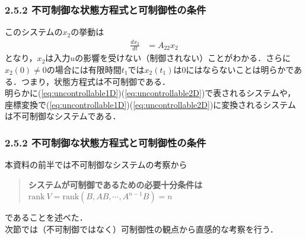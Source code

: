 \begin{frame}[t]
\frametitle{2.5.2 不可制御な状態方程式と可制御性の条件}
このシステムの$x_2$の挙動は
\begin{align}
 \frac{dx_2}{dt} &= A_{22} x_2
\end{align}
となり，$x_2$は入力$u$の影響を受けない（制御されない）ことがわかる．さらに$x_2(0) \neq 0$の場合には有限時間$t_1$では$x_2(t_1)$は$0$にはならないことは明らかである．つまり，状態方程式は不可制御である．
\\[3mm]

明らかに(\ref{eq:uncontrollable1D})(\ref{eq:uncontrollable2D})で表されるシステムや，座標変換で(\ref{eq:uncontrollable1D})(\ref{eq:uncontrollable2D})に変換されるシステムは不可制御なシステムである．

\end{frame}


\begin{frame}[t]
\frametitle{2.5.2 不可制御な状態方程式と可制御性の条件}
本資料の前半では不可制御なシステムの考察から

\begin{quote}
{\bf システムが可制御であるための必要十分条件は\\
$\mbox{rank}\ V = \mbox{rank} (B,AB,\cdots,A^{n-1}B) = n$}
\end{quote}

であることを述べた．
\\[3mm]

次節では（不可制御ではなく）可制御性の観点から直感的な考察を行う．

\end{frame}

